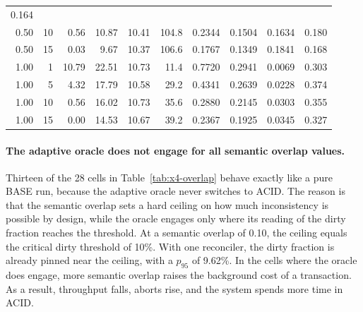 \begin{table}[!htb]
\begin{tabular}{r r r r r r r r r r}
    0.164
    \\
    0.50                   & 10                           & 0.56          &
    10.87                  & 10.41                        & 104.8
                           & 0.2344                       & 0.1504        & 0.1634 &
    0.180
    \\
    0.50                   & 15                           & 0.03          & 9.67
                           & 10.37                        & 106.6         &
    0.1767                 & 0.1349                       & 0.1841        &
    0.168
    \\
    \midrule
    1.00                   & 1                            & 10.79         &
    22.51                  & 10.73                        & 11.4
                           & 0.7720                       & 0.2941        & 0.0069 &
    0.303
    \\
    1.00                   & 5                            & 4.32          &
    17.79                  & 10.58                        & 29.2
                           & 0.4341                       & 0.2639        & 0.0228 &
    0.374
    \\
    1.00                   & 10                           & 0.56          &
    16.02                  & 10.73                        & 35.6
                           & 0.2880                       & 0.2145        & 0.0303 &
    0.355
    \\
    1.00                   & 15                           & 0.00          &
    14.53                  & 10.67                        & 39.2
                           & 0.2367                       & 0.1925        & 0.0345 &
    0.327
    \\
    \bottomrule
  \end{tabular}
\end{table}

\paragraph{The adaptive oracle does not engage for all semantic
  overlap values.}\label{sec:x4-engagement} Thirteen of the 28 cells in
Table~\ref{tab:x4-overlap} behave exactly like a pure BASE run, because the adaptive oracle
never switches to ACID. The reason is that the semantic overlap sets a hard
ceiling on how much inconsistency is possible by design, while the oracle engages
only where its reading of the dirty fraction reaches the threshold. At a
semantic overlap of 0.10, the ceiling equals the critical dirty threshold of
10\%. With one reconciler, the dirty
fraction is already pinned near the ceiling, with a $p_{95}$ of 9.62\%. In the cells where
the oracle does engage, more semantic overlap raises the background cost of a
transaction. As a result, throughput falls, aborts rise, and the system spends
more time in ACID.

